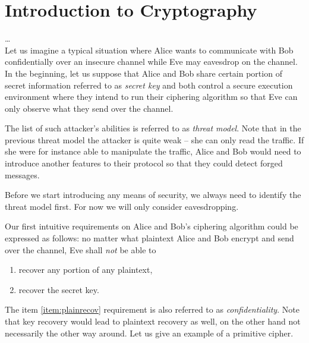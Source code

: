 \section{Introduction to Cryptography}
\label{sec:introcrypto}


\ldots\\
Let us imagine a typical situation where Alice wants to communicate with Bob confidentially over an insecure channel while Eve may eavesdrop on the channel. In the beginning, let us suppose that Alice and Bob share certain portion of secret information referred to as {\em secret key} and both control a secure execution environment where they intend to run their ciphering algorithm so that Eve can only observe what they send over the channel.

\begin{note}
\label{note:threat}
	The list of such attacker's abilities is referred to as {\em threat model}. Note that in the previous threat model the attacker is quite weak -- she can only read the traffic. If she were for instance able to manipulate the traffic, Alice and Bob would need to introduce another features to their protocol so that they could detect forged messages.
	
	Before we start introducing any means of security, we always need to identify the threat model first. For now we will only consider eavesdropping.
\end{note}

Our first intuitive requirements on Alice and Bob's ciphering algorithm could be expressed as follows: no matter what plaintext Alice and Bob encrypt and send over the channel, Eve shall {\em not} be able to
\begin{enumerate}
	\item recover any portion of any plaintext, \label{item:plainrecov}
	\item recover the secret key. \label{item:keyrecov}
\end{enumerate}
The item \ref{item:plainrecov} requirement is also referred to as {\em confidentiality}. Note that key recovery would lead to plaintext recovery as well, on the other hand not necessarily the other way around. Let us give an example of a primitive cipher.

